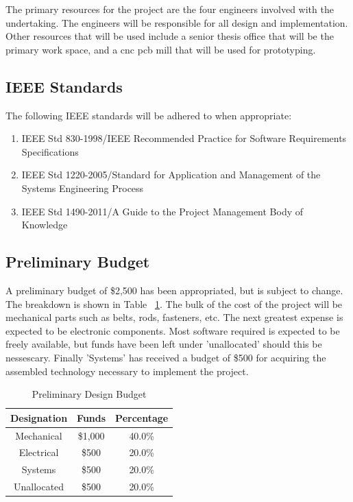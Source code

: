\documentclass[11pt]{report}
\begin{document}
The primary resources for the project are the four engineers involved with the undertaking.
The engineers will be responsible for all design and implementation.
Other resources that will be used include a senior thesis office that will be the primary work space, and a \gls{cnc} \gls{pcb} mill that will be used for prototyping.

\subsection{IEEE Standards}
The following IEEE standards will be adhered to when appropriate:
\begin{enumerate} \parskip2pt
	\item IEEE Std 830-1998/IEEE Recommended Practice for Software Requirements Specifications
	\item IEEE Std 1220-2005/Standard for Application and Management of the Systems Engineering Process
	\item IEEE Std 1490-2011/A Guide to the Project Management Body of Knowledge
\end{enumerate}

\subsection{Preliminary Budget}
A preliminary budget of \$2,500 has been appropriated, but is subject to change.
The breakdown is shown in Table ~\ref{table:budget}.
The bulk of the cost of the project will be mechanical parts such as belts, rods, fasteners, etc.
The next greatest expense is expected to be electronic components.
Most software required is expected to be freely available, but funds have been left under 'unallocated' should this be nessescary.
Finally 'Systems' has received a budget of \$500 for acquiring the assembled technology necessary to implement the project. 

\begin{table}[ht] 
	\centering 
	\begin{tabular}{c c c} 
		Designation	& Funds 		& Percentage\\
		\hline
		Mechanical	& \$1,000 	& 40.0\% \\ 
		Electrical	& \$500 		& 20.0\% \\ 
		Systems		& \$500 		& 20.0\% \\ 
		Unallocated	& \$500 		& 20.0\% \\
	\end{tabular} 
	\caption{Preliminary Design Budget}
	\label{table:budget}
\end{table}
\end{document}
